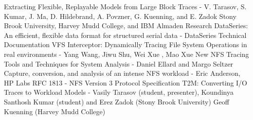 \documentclass[conference]{IEEEtran}
\begin{document}
%
%
%
\begin{thebibliography}{1}

Extracting Flexible, Replayable Models from Large Block Traces - V.
Tarasov, S. Kumar, J. Ma, D. Hildebrand, A. Povzner, G. Kuenning, and
E. Zadok Stony Brook University, Harvey Mudd College, and IBM Almaden
Research
DataSeries: An efficient, flexible data format for structured serial data
- DataSeries Technical Documentation
VFS Interceptor: Dynamically Tracing File System Operations in real
environments - Yang Wang, Jiwu Shu, Wei Xue , Mao Xue
New NFS Tracing Tools and Techniques for System Analysis - Daniel
Ellard and Margo Seltzer
Capture, conversion, and analysis of an intense NFS workload - Eric
Anderson, HP Labs
RFC 1813 - NFS Version 3 Protocol Specification
T2M: Converting I/O Traces to Workload Models - Vasily Tarasov (student, presenter), Koundinya Santhosh Kumar (student)
and Erez Zadok (Stony Brook University)
Geoff Kuenning (Harvey Mudd College)
\end{thebibliography}



\end{document}
